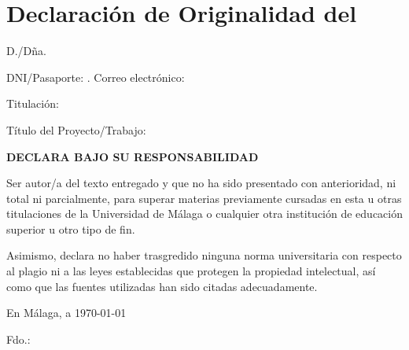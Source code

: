 \chapter*{Declaración de Originalidad del \tfeTFE}

\begin{flushleft}
    D./Dña. \tfeAuthor
    
    DNI/Pasaporte: \tfeNIF. Correo electrónico: \tfeEmail
    
    Titulación: \tfeDegree
    
    Título del Proyecto/Trabajo: \tfeTitle
\end{flushleft}

\vspace{0.5cm}

\begin{center}
    {\Large \textbf{DECLARA BAJO SU RESPONSABILIDAD}}
\end{center}

\vspace{0.5cm}

Ser autor/a del texto entregado y que no ha sido presentado con anterioridad, ni total ni parcialmente, para superar materias previamente cursadas en esta u otras titulaciones de la Universidad de Málaga o cualquier otra institución de educación superior u otro tipo de fin.


Asimismo, declara no haber trasgredido ninguna norma universitaria con respecto al plagio ni a las leyes establecidas que protegen la propiedad intelectual, así como que las fuentes utilizadas han sido citadas adecuadamente.

\vspace{1cm}


\begin{flushright}
    En Málaga, a \today
    
    \vspace{4cm}
    
    Fdo.: \tfeAuthor
\end{flushright}

